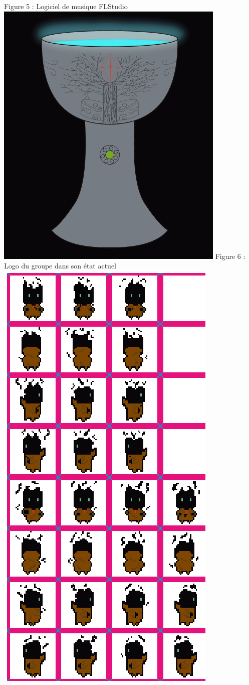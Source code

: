 \documentclass[]{extarticle}
\begin{document}
\begin{center}
\smallbreak
Figure 5 : Logiciel de musique FLStudio
\bigbreak
\bigbreak
\includegraphics[scale = 0.3]{coupe.png}
\smallbreak
Figure 6 : Logo du groupe dans son état actuel
\bigbreak
\bigbreak
\includegraphics[scale = 0.25]{spritePerso.png}

\end{center}
\end{document}
